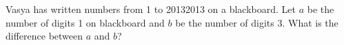 \problem
Vasya has written numbers from 1 to 20132013 on a blackboard.
Let $a$ be the number of digits 1 on blackboard and $b$ be the number of digits
3.
What is the difference between $a$ and $b$?
\solution
\endproblem
